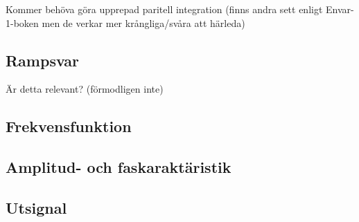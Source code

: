 Kommer behöva göra upprepad paritell integration (finns andra sett enligt Envar-1-boken men de verkar mer krångliga/svåra att härleda)

\subsection{Rampsvar}
Är detta relevant?
(förmodligen inte)

\subsection{Frekvensfunktion}


\subsection{Amplitud- och faskaraktäristik}


\subsection{Utsignal}
